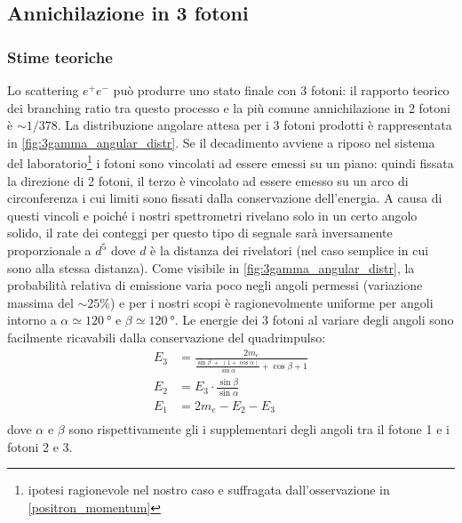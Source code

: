 \subsection{Annichilazione in 3 fotoni}

\subsubsection{Stime teoriche}
Lo scattering $e^+e^-$ può produrre uno stato finale con 3 fotoni: il rapporto teorico dei branching ratio tra questo processo e la più comune annichilazione in 2 fotoni è $\sim 1/378$\cite{3gamma}. La distribuzione angolare attesa per i 3 fotoni prodotti è rappresentata in \autoref{fig:3gamma_angular_distr}. Se il decadimento avviene a riposo nel sistema del laboratorio\footnote{ipotesi ragionevole nel nostro caso e suffragata dall'osservazione in \autoref{positron_momentum}} i fotoni sono vincolati ad essere emessi su un piano: quindi fissata la direzione di 2 fotoni, il terzo è vincolato ad essere emesso su un arco di circonferenza i cui limiti sono fissati dalla conservazione dell'energia. A causa di questi vincoli e poiché i nostri spettrometri rivelano solo in un certo angolo solido, il rate dei conteggi per questo tipo di segnale sarà inversamente proporzionale a $d^5$ dove $d$ è la distanza dei rivelatori (nel caso semplice in cui sono alla stessa distanza).
Come visibile in \autoref{fig:3gamma_angular_distr}, la probabilità relativa di emissione varia poco negli angoli permessi (variazione massima del $\sim 25\%$) e per i nostri scopi è ragionevolmente uniforme per angoli intorno a $\alpha\simeq \SI{120}{\degree}$ e $\beta\simeq\SI{120}{\degree}$.
Le energie dei 3 fotoni al variare degli angoli sono facilmente ricavabili dalla conservazione del quadrimpulso:
\begin{align*}
\label{eq:3gamma_energy}
E_3 &= \frac{2 m_e}{\frac{\sin\beta \;+\;(1+\cos\alpha)}{\sin\alpha}+\cos\beta+1}\\
E_2 &= E_3 \cdot \frac{\sin\beta}{\sin\alpha}\\
E_1 &= 2m_e - E_2 - E_3\\
\end{align*}
dove $\alpha$ e $\beta$ sono rispettivamente gli i supplementari degli angoli tra il fotone 1 e i fotoni 2 e 3.

